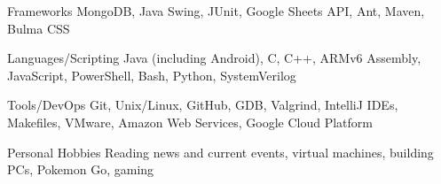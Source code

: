

\begin{cvskills}

  \cvskill
    {Frameworks} %
    {MongoDB, Java Swing, JUnit, Google Sheets API, Ant, Maven, Bulma CSS} %

  \cvskill
    {Languages/Scripting} %
    {Java (including Android), C, C++, ARMv6 Assembly, JavaScript, PowerShell, Bash, Python, SystemVerilog} %
    
  \cvskill
    {Tools/DevOps} %
    {Git, Unix/Linux, GitHub, GDB, Valgrind, IntelliJ IDEs, Makefiles, VMware, Amazon Web Services, Google Cloud Platform} %

  \cvskill
  {Personal Hobbies} %
  {Reading news and current events, virtual machines, building PCs, Pokemon Go, gaming} %

\end{cvskills}
